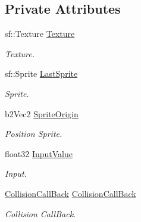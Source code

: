 \subsection*{Private Attributes}
\begin{DoxyCompactItemize}
\item 
\mbox{\label{class_object_a6576de27eb814a84d0d4abd87c5960a6}} 
sf\+::\+Texture \hyperlink{class_object_a6576de27eb814a84d0d4abd87c5960a6}{Texture}
\begin{DoxyCompactList}\small\item\em Texture. \end{DoxyCompactList}\item 
\mbox{\label{class_object_ae594af01bacdba53a1080ec5fba7a6ff}} 
sf\+::\+Sprite \hyperlink{class_object_ae594af01bacdba53a1080ec5fba7a6ff}{Last\+Sprite}
\begin{DoxyCompactList}\small\item\em Sprite. \end{DoxyCompactList}\item 
\mbox{\label{class_object_af1a4abf4061dfb1113ea703757b33efe}} 
b2\+Vec2 \hyperlink{class_object_af1a4abf4061dfb1113ea703757b33efe}{Sprite\+Origin}
\begin{DoxyCompactList}\small\item\em Position Sprite. \end{DoxyCompactList}\item 
\mbox{\label{class_object_abb13fcf3d7eb007673019f304d83c0ce}} 
float32 \hyperlink{class_object_abb13fcf3d7eb007673019f304d83c0ce}{Input\+Value}
\begin{DoxyCompactList}\small\item\em Input. \end{DoxyCompactList}\item 
\mbox{\label{class_object_a2c39ecbd711c02cae7408d25a665446f}} 
\hyperlink{class_collision_call_back}{Collision\+Call\+Back} \hyperlink{class_object_a2c39ecbd711c02cae7408d25a665446f}{Collision\+Call\+Back}
\begin{DoxyCompactList}\small\item\em Collision Call\+Back. \end{DoxyCompactList}\end{DoxyCompactItemize}


